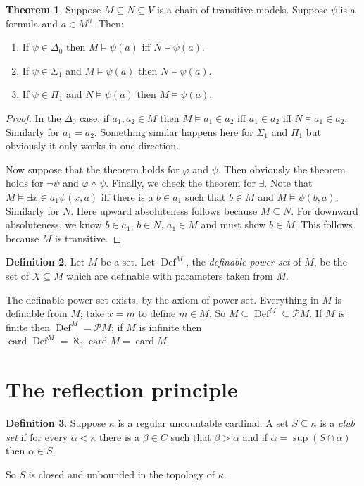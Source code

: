 \documentclass[12pt]{report}
\newcommand{\card}{\operatorname{card}}
\newcommand{\pset}{\mathcal{P}}
\DeclareMathOperator{\Def}{Def}
\newcommand{\dfn}[1]{\emph{#1}\index{#1}}
\theoremstyle{definition}
\newtheorem{theorem}{Theorem}[chapter]
\newtheorem{definition}[theorem]{Definition}
\begin{document}
\begin{theorem}
Suppose $M \subseteq N \subseteq V$ is a chain of transitive models. Suppose $\psi$ is a formula and $a \in M^n$. Then:
\begin{enumerate}
\item If $\psi \in \Delta_0$ then $M \models \psi(a)$ iff $N \models \psi(a)$.
\item If $\psi \in \Sigma_1$ and $M \models \psi(a)$ then $N \models \psi(a)$.
\item If $\psi \in \Pi_1$ and $N \models \psi(a)$ then $M \models \psi(a)$.
\end{enumerate}
\end{theorem}
\begin{proof}
In the $\Delta_0$ case, if $a_1, a_2 \in M$ then $M \models a_1 \in a_2$ iff $a_1 \in a_2$ iff $N \models a_1 \in a_2$. Similarly for $a_1 = a_2$. Something similar happens here for $\Sigma_1$ and $\Pi_1$ but obviously it only works in one direction.

Now suppose that the theorem holds for $\varphi$ and $\psi$. Then obviously the theorem holds for $\neg\psi$ and $\varphi \wedge \psi$. Finally, we check the theorem for $\exists$. Note that $M \models \exists x \in a_1 \psi(x, a)$ iff there is a $b \in a_1$ such that $b \in M$ and $M \models \psi(b, a)$. Similarly for $N$. Here upward absoluteness follows because $M \subseteq N$. For downward absoluteness, we know $b \in a_1$, $b \in N$, $a_1 \in M$ and must show $b \in M$. This follows because $M$ is transitive.
\end{proof}

\begin{definition}
Let $M$ be a set. Let $\Def^M$, the \dfn{definable power set} of $M$, be the set of $X \subseteq M$ which are definable with parameters taken from $M$.
\end{definition}
The definable power set exists, by the axiom of power set. Everything in $M$ is definable from $M$; take $x = m$ to define $m \in M$. So $M \subseteq \Def^M \subseteq \pset M$. If $M$ is finite then $\Def^M = \pset M$; if $M$ is infinite then $\card \Def^M = \aleph_0\card M = \card M$.

\section{The reflection principle}
\begin{definition}
Suppose $\kappa$ is a regular uncountable cardinal. A set $S \subseteq \kappa$ is a \dfn{club set} if for every $\alpha < \kappa$ there is a $\beta \in C$ such that $\beta > \alpha$ and if $\alpha = \sup(S \cap \alpha)$ then $\alpha \in S$.
\end{definition}
So $S$ is closed and unbounded in the topology of $\kappa$.
\end{document}
